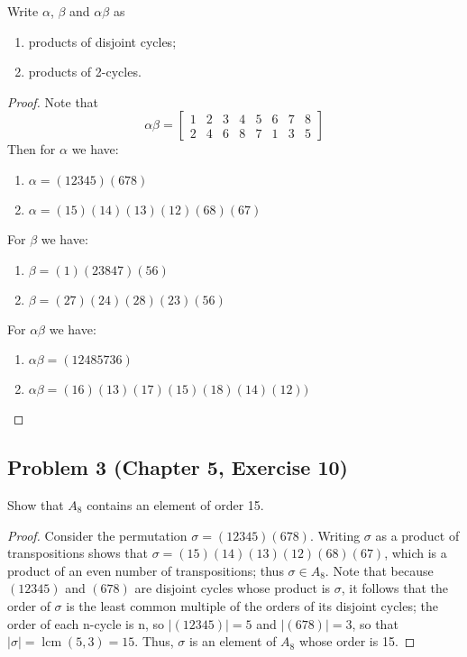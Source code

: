 \documentclass{article}
\DeclareMathOperator{\lcm}{lcm}
\begin{document}
Write $\alpha$, $\beta$ and $\alpha\beta$ as
\begin{enumerate}[label=\textbf{\alph*.}]
    \item products of disjoint cycles;
    \item products of 2-cycles.
\end{enumerate}


\begin{proof}
Note that
\[ \alpha\beta = \begin{bmatrix}
1 & 2 & 3 & 4 & 5 & 6 & 7 & 8 \\
2 & 4 & 6 & 8 & 7 & 1 & 3 & 5
\end{bmatrix}\]
Then for $\alpha$ we have:
\begin{enumerate}[label=\textbf{\alph*.}]
    \item $\alpha = (12345)(678)$
    \item $\alpha = (15)(14)(13)(12)(68)(67)$
\end{enumerate}
For $\beta$ we have:
\begin{enumerate}[label=\textbf{\alph*.}]
    \item $\beta = (1)(23847)(56)$
    \item $\beta = (27)(24)(28)(23)(56)$
\end{enumerate}
For $\alpha\beta$ we have:
\begin{enumerate}[label=\textbf{\alph*.}]
    \item $\alpha\beta = (12485736)$
    \item $\alpha\beta = (16)(13)(17)(15)(18)(14)(12))$
\end{enumerate}
\end{proof}

\subsection*{Problem 3 (Chapter 5, Exercise 10)}
Show that $A_8$ contains an element of order 15.

\begin{proof}
Consider the permutation $\sigma = (12345)(678)$. Writing $\sigma$ as a product of transpositions shows that $\sigma = (15)(14)(13)(12)(68)(67)$, which is a product of an even number of transpositions; thus $\sigma \in A_8$. Note that because $(12345)$ and $(678)$ are disjoint cycles whose product is $\sigma$, it follows that the order of $\sigma$ is the least common multiple of the orders of its disjoint cycles; the order of each n-cycle is n, so $|(12345)| = 5$ and $|(678)| = 3$, so that $|\sigma| = \lcm{(5, 3)} = 15$. Thus, $\sigma$ is an element of $A_8$ whose order is 15.

\end{proof}
\end{document}
